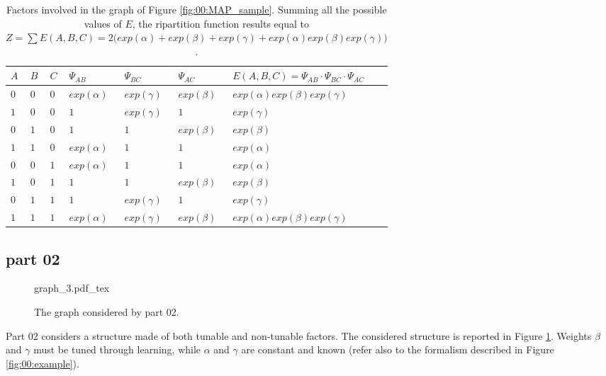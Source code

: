 \begin{table}[]
\centering
\begin{tabular}{|l|l|l|l|l|l|l|}
$A$ & $B$ & $C$ & $\Psi_{AB}$ & $\Psi_{BC}$ & $\Psi_{AC}$ & $E(A,B,C) =\Psi_{AB} \cdot \Psi_{BC} \cdot \Psi_{AC} $ \\
\hline
$0$ & $0$ & $0$ & $exp(\alpha)$ & $exp(\gamma)$ & $exp(\beta)$ & $exp(\alpha)exp(\beta)exp(\gamma)$ \\
\hline
$1$ & $0$ & $0$ & $1$ & $exp(\gamma)$ & $1$ & $exp(\gamma)$ \\
\hline
$0$ & $1$ & $0$ & $1$ & $1$ & $exp(\beta)$ & $exp(\beta)$ \\
\hline
$1$ & $1$ & $0$ & $exp(\alpha)$ & $1$ & $1$ & $exp(\alpha)$ \\
\hline
$0$ & $0$ & $1$ & $exp(\alpha)$ & $1$ & $1$ & $exp(\alpha)$ \\
\hline
$1$ & $0$ & $1$ & $1$ & $1$ & $exp(\beta)$ & $exp(\beta)$ \\
\hline
$0$ & $1$ & $1$ & $1$ & $exp(\gamma)$ & $1$ & $exp(\gamma)$ \\
\hline
$1$ & $1$ & $1$ & $exp(\alpha)$ & $exp(\gamma)$ & $exp(\beta)$ & $exp(\alpha)exp(\beta)exp(\gamma)$ \\
\hline 
\end{tabular}
\caption{Factors involved in the graph of Figure \ref{fig:00:MAP_sample}. Summing all the possible values of $E$, the ripartition function results equal to $Z = \sum E(A,B,C) = 2 \bigg( exp(\alpha) +  exp(\beta) + exp(\gamma) + exp(\alpha)exp(\beta)exp(\gamma) \bigg)$.} 
\label{tab:06:t1}
\end{table} 

\subsection{part 02}

\begin{figure}
	\centering
\def\svgwidth{0.5 \textwidth}
{graph_3.pdf_tex} 
\caption{The graph considered by part 02.}
\label{fig:sample_06:1}
\end{figure}

Part 02 considers a structure made of both tunable and non-tunable factors. The considered structure is reported in Figure \ref{fig:sample_06:1}.
Weights $\beta$ and $\gamma$ must be tuned through learning, while $\alpha$ and $\gamma$ are constant and known (refer also to the formalism described in Figure \ref{fig:00:example}).

